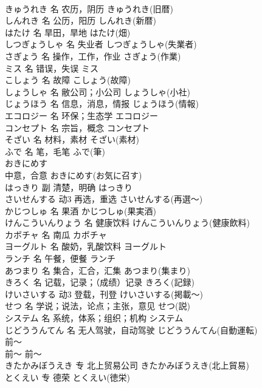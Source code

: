 \documentclass[8pt]{extreport}
\begin{document}
\begin{CJK}{UTF8}{min}
\\	きゅうれき	名	农历，阴历	きゅうれき(旧暦)	
\\	しんれき	名	公历，阳历	しんれき(新暦)	
\\	はたけ	名	旱田，旱地	はたけ(畑)	
\\	しつぎょうしゃ	名	失业者	しつぎょうしゃ(失業者)	
\\	さぎょう	名	操作，工作，作业	さぎょう(作業)	
\\	ミス	名	错误，失误	ミス	
\\	こしょう	名	故障	こしょう(故障)	
\\	しょうしゃ	名	敝公司；小公司	しょうしゃ(小社)	
\\	じょうほう	名	信息，消息，情报	じょうほう(情報)	
\\	エコロジー	名	环保；生态学	エコロジー	
\\	コンセプト	名	宗旨，概念	コンセプト	
\\	そざい	名	材料，素材	そざい(素材)	
\\	ふで	名	笔，毛笔	ふで(筆)	
\\	おきにめす	
\\	中意，合意	おきにめす(お気に召す)	
\\	はっきり	副	清楚，明确	はっきり	
\\	さいせんする	动3	再选，重选	さいせんする(再選～)	
\\	かじつしゅ	名	果酒	かじつしゅ(果実酒)	
\\	けんこういんりょう	名	健康饮料	けんこういんりょう(健康飲料)	
\\	カボチャ	名	南瓜	カボチャ	
\\	ヨーグルト	名	酸奶，乳酸饮料	ヨーグルト	
\\	ランチ	名	午餐，便餐	ランチ	
\\	あつまり	名	集合，汇合，汇集	あつまり(集まり)	
\\	きろく	名	记载，记录；（成绩）记录	きろく(記録)	
\\	けいさいする	动3	登载，刊登	けいさいする(掲載～)	
\\	せつ	名	学说；说法，论点；主张，意见	せつ(説)	
\\	システム	名	系统，体系；组织；机构	システム	
\\	じどううんてん	名	无人驾驶，自动驾驶	じどううんてん(自動運転)	
\\	前～	
\\	前～	前～	
\\	きたかみぼうえき	专	北上贸易公司	きたかみぼうえき(北上貿易)	
\\	とくえい	专	德荣	とくえい(徳栄)	

\end{CJK}
\end{document}

